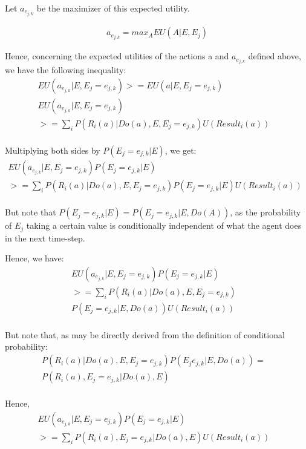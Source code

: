 \documentclass[10pt]{article}
\begin{document}
Let $a_{e_{j,k}}$ be the maximizer of this expected utility.

\begin{eqnarray}
a_{e_{j,k}} = max_{A} EU(A|E,E_{j}) 
\end{eqnarray}

Hence, concerning the expected utilities of the actions a and $a_{e_{j,k}}$ defined above, we have the following inequality:
\begin{eqnarray}
EU(a_{e_{j,k}}|E,E_{j}=e_{j,k}) >= EU(a|E,E_{j}=e_{j,k}) &\\
EU(a_{e_{j,k}}|E,E_{j}=e_{j,k}) & \\
>= \sum_{i} P(R_{i}(a)|Do(a),E,E_{j}=e_{j,k})U(Result_{i}(a)) &\\
\end{eqnarray}

Multiplying both sides by $P(E_{j}=e_{j,k}|E)$, we get:
\begin{eqnarray}
EU(a_{e_{j,k}}|E,E_{j}=e_{j,k})P(E_{j}=e_{j,k}|E) & \\
>= \sum_{i} P(R_{i}(a)|Do(a),E,E_{j}=e_{j,k}) P(E_{j}=e_{j,k}|E) U(Result_{i}(a)) &\\
\end{eqnarray}

But note that $P(E_{j}=e_{j,k}|E) = P(E_{j}=e_{j,k}|E,Do(A))$, as the probability of $E_{j}$ taking a certain value is conditionally independent of what the agent does in the next time-step.

Hence, we have:
\begin{eqnarray}
EU(a_{e_{j,k}}|E,E_{j}=e_{j,k})P(E_{j}=e_{j,k}|E) & \\
>= \sum_{i} P(R_{i}(a)|Do(a),E,E_{j}=e_{j,k}) &\\
P(E_{j}=e_{j,k}|E,Do(a)) U(Result_{i}(a)) &\\
\end{eqnarray}

But note that, as may be directly derived from the definition of conditional probability:
\begin{eqnarray}
P(R_{i}(a)|Do(a),E,E_{j}=e_{j,k})P(E_{j}e_{j,k}|E,Do(a)) = &\\
P(R_{i}(a),E_{j}=e_{j,k}|Do(a),E) &\\
\end{eqnarray}

Hence,
\begin{eqnarray}
EU(a_{e_{j,k}}|E,E_{j}=e_{j,k})P(E_{j}=e_{j,k}|E) & \\
>= \sum_{i} P(R_{i}(a),E_{j}=e_{j,k}|Do(a),E) U(Result_{i}(a)) &\\
\end{eqnarray}
\end{document}
